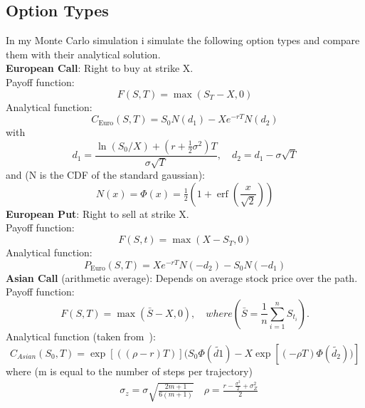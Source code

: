 \documentclass[11pt]{article}
\begin{document}
\subsection{Option Types}
In my Monte Carlo simulation i simulate the following option types and compare them with their analytical solution.\\
\textbf{European Call}: Right to buy at strike X.\\
Payoff function:
\begin{equation}
    F(S,T) = \max(S_T - X, 0)
\end{equation}
Analytical function:
\begin{equation}
    C_{\text{Euro}}(S,T)=S_{0}N(d_{1})-X e^{-rT}N(d_{2})
\end{equation}
with
\begin{equation}
    d_{1}=\frac{\ln(S_{0}/X)+\left(r+\tfrac{1}{2}\sigma^{2}\right)T}{\sigma\sqrt{T}},\quad
    d_{2}=d_{1}-\sigma\sqrt{T}
\end{equation}
and (N is the CDF of the standard gaussian):
\begin{equation}
    N(x)= \Phi(x) = \tfrac{1}{2}\left(1+\operatorname{erf}\!\left(\frac{x}{\sqrt{2}}\right)\right)
\end{equation}
\textbf{European Put}: Right to sell at strike X.\\
Payoff function:
\begin{equation}
    F(S,t) = \max(X - S_T, 0)
\end{equation}
Analytical function:
\begin{equation}
    P_{\text{Euro}}(S,T)=X e^{-rT}N(-d_{2})-S_{0}N(-d_{1})
\end{equation}
\textbf{Asian Call} (arithmetic average): Depends on average stock price over the path.\\
Payoff function:
\begin{equation}
    F(S,T) = \max(\bar{S} - X, 0), \quad where (\bar{S} = \frac{1}{n}\sum_{i=1}^n S_{t_i}).
\end{equation}
Analytical function (taken from~\cite{divaAsian}):
\begin{equation}
    C_{Asian}(S_0, T) = \exp\left[((\rho - r)T) \right](S_0 \Phi(\tilde{d1}) - X \exp\left[(-\rho T) \Phi(\tilde{d_2}))\right]
\end{equation}
where (m is equal to the number of steps per trajectory)
\begin{align}
    &\sigma_z = \sigma \sqrt{\frac{2m+1}{6(m+1)}} \quad \rho = \frac{r-\frac{\sigma^2}{2} + \sigma_Z^2}{2}
\end{align}
\end{document}
